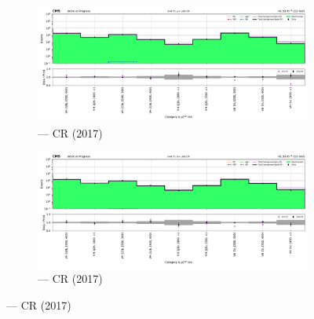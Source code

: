 \begin{figure}[htbp]
    \centering
    \begin{subfigure}[b]{0.49\textwidth}
        \includegraphics[width=\textwidth]{chapters/higgstoinv/figures/mountain_ranges/2017/VH/Wmunu_tree_fit_s-abs_values_VH_cats.pdf}
        \caption{\VH --- \singleMuCr \gls{CR} (2017)}
    \end{subfigure}
    \hfill
    \begin{subfigure}[b]{0.49\textwidth}
        \includegraphics[width=\textwidth]{chapters/higgstoinv/figures/mountain_ranges/2017/VH/Wenu_tree_fit_s-abs_values_VH_cats.pdf}
        \caption{\VH --- \singleEleCr \gls{CR} (2017)}
    \end{subfigure}


\end{figure}
